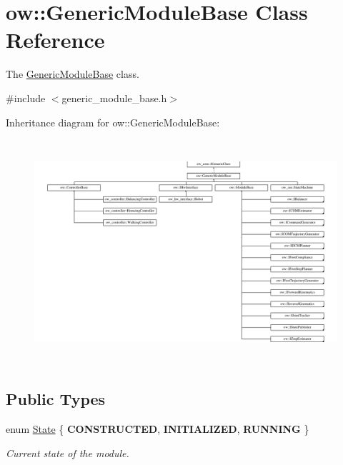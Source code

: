 \hypertarget{classow_1_1GenericModuleBase}{}\section{ow\+:\+:Generic\+Module\+Base Class Reference}
\label{classow_1_1GenericModuleBase}


The \hyperlink{classow_1_1GenericModuleBase}{Generic\+Module\+Base} class.  




{\ttfamily \#include $<$generic\+\_\+module\+\_\+base.\+h$>$}

Inheritance diagram for ow\+:\+:Generic\+Module\+Base\+:\begin{figure}[H]
\begin{center}
\leavevmode
\includegraphics[height=8.334884cm]{db/dda/classow_1_1GenericModuleBase}
\end{center}
\end{figure}
\subsection*{Public Types}
\begin{DoxyCompactItemize}
\item 
enum \hyperlink{classow_1_1GenericModuleBase_a7886432615a5e12657f4a684607e6fdf}{State} \{ {\bfseries C\+O\+N\+S\+T\+R\+U\+C\+T\+ED}, 
{\bfseries I\+N\+I\+T\+I\+A\+L\+I\+Z\+ED}, 
{\bfseries R\+U\+N\+N\+I\+NG}
 \}\hypertarget{classow_1_1GenericModuleBase_a7886432615a5e12657f4a684607e6fdf}{}\label{classow_1_1GenericModuleBase_a7886432615a5e12657f4a684607e6fdf}
\begin{DoxyCompactList}\small\item\em Current state of the module. \end{DoxyCompactList}
\end{DoxyCompactItemize}
